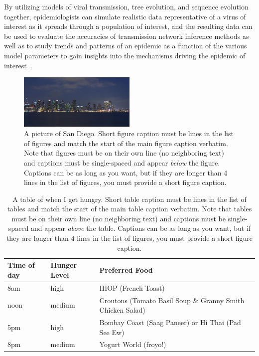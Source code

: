 By utilizing models of viral transmission, tree evolution, and sequence evolution together, epidemiologists can simulate realistic data representative of a virus of interest as it spreads through a population of interest, and the resulting data can be used to evaluate the accuracies of transmission network inference methods as well as to study trends and patterns of an epidemic as a function of the various model parameters to gain insights into the mechanisms driving the epidemic of interest~\cite{Ratmann2017}.

\begin{figure}[h] 
  \centering
  \includegraphics[width=0.5\textwidth]{sandiego}
  \caption[A picture of San Diego. Short figure caption must be  lines in the list of figures]
{A picture of San Diego.  Short figure caption must be  lines in the list of figures and match the start of the main figure caption verbatim. Note that figures must be on their own line (no neighboring text) and captions must be single-spaced and appear \protect\textit{below} the figure.  Captions can be as long as you want, but if they are longer than 4 lines in the list of figures, you must provide a short figure caption.}
  \label{fig:sandiego}
\end{figure}

\vspace{0.25in}
\begin{table}[!ht]
\caption[A table of when I get hungry.  Short table caption must be  lines in the list of tables]{A table of when I get hungry. Short table caption must be  lines in the list of tables and match the start of the main table caption verbatim.  Note that tables must be on their own line (no neighboring text) and captions must be single-spaced and appear \protect\textit{above} the table.  Captions can be as long as you want, but if they are longer than 4 lines in the list of figures, you must provide a short figure caption.}
\vspace{-0.25in}
\begin{center}
\begin{tabular}{|p{1in}|p{2in}|p{3in}|}
\hline
Time of day & Hunger Level & Preferred Food \\
\hline
8am & high & IHOP (French Toast) \\
\hline
noon & medium & Croutons (Tomato Basil Soup \& Granny Smith Chicken Salad) \\
\hline
5pm & high & Bombay Coast (Saag Paneer) or Hi Thai (Pad See Ew) \\
\hline
8pm & medium & Yogurt World (froyo!) \\
\hline
\end{tabular}
\end{center}
\label{tab:analysis3}
\end{table}

